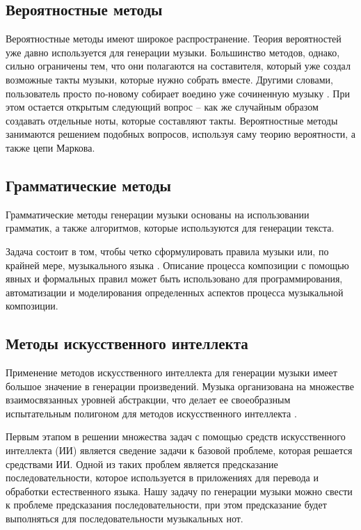 \subsection{Вероятностные методы}

Вероятностные методы имеют широкое распространение. Теория вероятностей уже давно используется для генерации музыки. Большинство методов, однако, сильно ограничены тем, что они полагаются на составителя, который уже создал возможные такты музыки, которые нужно собрать вместе. Другими словами, пользователь просто по-новому собирает воедино уже сочиненную музыку \cite{prob-methods}. При этом остается открытым следующий вопрос -- как же случайным образом создавать отдельные ноты, которые составляют такты. Вероятностные методы занимаются решением подобных вопросов, используя саму теорию вероятности, а также цепи Маркова.


\subsection{Грамматические методы}

Грамматические методы генерации музыки основаны на использовании грамматик, а также алгоритмов, которые используются для генерации текста. 

Задача состоит в том, чтобы четко сформулировать правила музыки или, по крайней мере, музыкального языка \cite{gram-methods}. Описание процесса композиции с помощью явных и формальных правил может быть использовано для программирования, автоматизации и моделирования определенных аспектов процесса музыкальной композиции.


\subsection{Методы искусственного интеллекта}

Применение методов искусственного интеллекта для генерации музыки имеет большое значение в генерации произведений. Музыка организована на множестве взаимосвязанных уровней абстракции, что делает ее своеобразным испытательным полигоном для методов искусственного интеллекта \cite{ai-methods}.

Первым этапом в решении множества задач с помощью средств искусственного интеллекта (ИИ) является сведение задачи к базовой проблеме, которая решается средствами ИИ. Одной из таких проблем является предсказание последовательности, которое используется в приложениях для перевода и обработки естественного языка. Нашу задачу по генерации музыки можно свести к проблеме предсказания последовательности, при этом предсказание будет выполняться для последовательности музыкальных нот.

